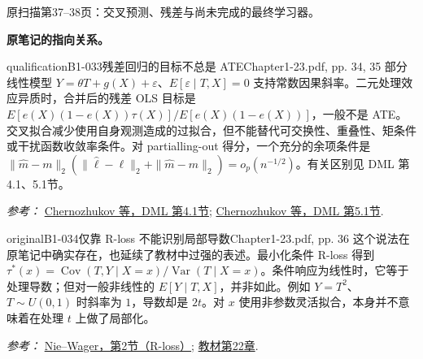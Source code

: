 {\begin{center}
\begin{tikzpicture}[>=Stealth, font=\small, line width=.65pt]
\end{tikzpicture}
\par{\small 原扫描第37--38页：交叉预测、残差与尚未完成的最终学习器。}
\end{center}
\par{}\smallskip\textbf{原笔记的指向关系。}\par\smallskip
{}
\begin{reviewnote}{qualification}{B1-033}{残差回归的目标不总是 ATE}{Chapter1-23.pdf, pp. 34, 35}
部分线性模型 $Y=\theta T+g(X)+\varepsilon$、$E[\varepsilon\mid T,X]=0$ 支持常数因果斜率。二元处理效应异质时，合并后的残差 OLS 目标是 $E[e(X)(1-e(X))\tau(X)]/E[e(X)(1-e(X))]$，一般不是 ATE。交叉拟合减少使用自身观测造成的过拟合，但不能替代可交换性、重叠性、矩条件或干扰函数收敛率条件。对 partialling-out 得分，一个充分的余项条件是 $\|\hat m-m\|_2(\|\hat\ell-\ell\|_2+\|\hat m-m\|_2)=o_p(n^{-1/2})$。有关区别见 DML 第4.1、5.1节。
\par\smallskip\textit{参考：} \href{https://arxiv.org/html/1608.00060v7#S4.SS1}{Chernozhukov 等，DML 第4.1节}; \href{https://arxiv.org/html/1608.00060v7#S5.SS1}{Chernozhukov 等，DML 第5.1节}.
\end{reviewnote}

\begin{reviewnote}{original}{B1-034}{仅靠 R-loss 不能识别局部导数}{Chapter1-23.pdf, pp. 36}
这个说法在原笔记中确实存在，也延续了教材中过强的表述。最小化条件 R-loss 得到 $\tau^*(x)=\operatorname{Cov}(T,Y\mid X=x)/\operatorname{Var}(T\mid X=x)$。条件响应为线性时，它等于处理导数；但对一般非线性的 $E[Y\mid T,X]$，并非如此。例如 $Y=T^2$、$T\sim U(0,1)$ 时斜率为 $1$，导数却是 $2t$。对 $x$ 使用非参数灵活拟合，本身并不意味着在处理 $t$ 上做了局部化。
\par\smallskip\textit{参考：} \href{https://arxiv.org/html/1712.04912v4#S2}{Nie--Wager，第2节（R-loss）}; \href{https://matheusfacure.github.io/python-causality-handbook/22-Debiased-Orthogonal-Machine-Learning.html}{教材第22章}.
\end{reviewnote}

}
